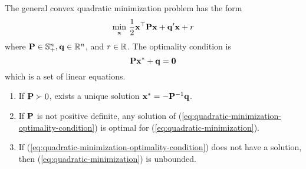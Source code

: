 \begin{example}
	The general convex quadratic minimization problem has the form
	\begin{equation}
		\min_{{\bf x}}\,\frac{1}{2}{\bf x}^{\top}{\bf P}{\bf x}+{\bf q}^{\prime}{\bf x}+r \label{eq:quadratic-minimization}
	\end{equation}
	where ${\bf P}\in\mathbb{S}_{+}^{n},{\bf q}\in{\mathbb R}^{n}$, and $r\in{\mathbb R}$. The optimality condition is
	\begin{equation}
		{\bf P}{\bf x}^{*}+{\bf q}=\mathbf{0}
		\label{eq:quadratic-minimization-optimality-condition}
	\end{equation}
	which is a set of linear equations.
	\begin{enumerate}
		\item If ${\bf P}\succ 0$, exists a unique solution ${\bf x}^{*}=-{\bf P}^{-1}{\bf q}$.
		\item If ${\bf P}$ is not positive definite, any solution of (\ref{eq:quadratic-minimization-optimality-condition}) is optimal for (\ref{eq:quadratic-minimization}).
		\item If (\ref{eq:quadratic-minimization-optimality-condition}) does not have a solution, then (\ref{eq:quadratic-minimization}) is unbounded.
	\end{enumerate}
\end{example}

